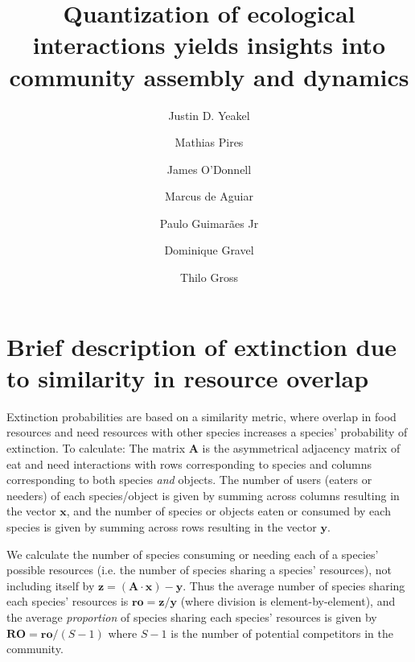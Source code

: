 \documentclass[onecolumn,preprintnumbers,amsmath,amssymb,superscriptaddress]{revtex4}
\begin{document}
\author{Justin D. Yeakel} 

\author{Mathias Pires} \affiliation{}

\author{James O'Donnell} \affiliation{}

\author{Marcus de Aguiar} \affiliation{}

\author{Paulo Guimar\~aes Jr} \affiliation{}

\author{Dominique Gravel} \affiliation{}

\author{Thilo Gross} \affiliation{}

\title{Quantization of ecological interactions yields insights into community assembly and dynamics}

\section{Brief description of extinction due to similarity in resource overlap}

Extinction probabilities are based on a similarity metric, where overlap in food resources and need resources with other species increases a species' probability of extinction.
To calculate: The matrix $\bm{A}$ is the asymmetrical adjacency matrix of eat and need interactions with rows corresponding to species and columns corresponding to both species \emph{and} objects.
The number of users (eaters or needers) of each species/object is given by summing across columns resulting in the vector $\bm{x}$, and the number of species or objects eaten or consumed by each species is given by summing across rows resulting in the vector $\bm{y}$.

We calculate the number of species consuming or needing each of a species' possible resources (i.e. the number of species sharing a species' resources), not including itself by $\bm{z} = (\bm{A}\cdot\bm{x}) - \bm{y}$.
Thus the average number of species sharing each species' resources is 
$\bm{ro} = \bm{z}/\bm{y}$ (where division is element-by-element), and the average \emph{proportion} of species sharing each species' resources is given by ${\bm{RO}} = \bm{ro}/(S-1)$ where $S-1$ is the number of potential competitors in the community.
\end{document}
